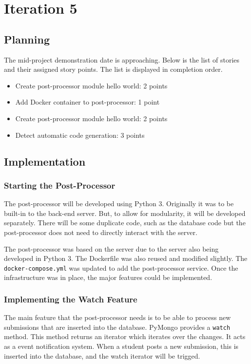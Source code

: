 \chapter{Iteration 5}
\section{Planning}
The mid-project demonstration date is approaching. Below is the list of stories and their assigned story points. The list is displayed in completion order.

\begin{itemize}
\item Create post-processor module hello world: 2 points
\item Add Docker container to post-processor: 1 point
\item Create post-processor module hello world: 2 points
\item Detect automatic code generation: 3 points
\end{itemize}

\section{Implementation}
\subsection{Starting the Post-Processor}
The post-processor will be developed using Python 3. Originally it was to be built-in to the back-end server. But, to allow for modularity, it will be developed separately. There will be some duplicate code, such as the database code but the post-processor does not need to directly interact with the server.

The post-processor was based on the server due to the server also being developed in Python 3. The Dockerfile was also reused and modified slightly. The \texttt{docker-compose.yml} was updated to add the post-processor service. Once the infrastructure was in place, the major features could be implemented.

\subsection{Implementing the Watch Feature}
The main feature that the post-processor needs is to be able to process new submissions that are inserted into the database. PyMongo provides a \texttt{watch} method. This method returns an iterator which iterates over the changes. It acts as a event notification system. When a student posts a new submission, this is inserted into the database, and the watch iterator will be trigged.

